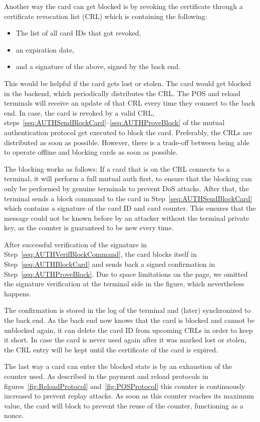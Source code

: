 \documentclass{article}
\begin{document}
Another way the card can get blocked is by revoking the certificate through a certificate revocation list (CRL) which is containing the following:
\begin{itemize}
    \item The list of all card IDs that got revoked,
    \item an expiration date,
    \item and a signature of the above, signed by the back end.
\end{itemize}
This would be helpful if the card gets lost or stolen.
The card would get blocked in the backend, which periodically distributes the CRL\@.
The POS and reload terminals will receive an update of that CRL every time they connect to the back end.
In case, the card is revoked by a valid CRL, steps~\ref{seq:AUTHSendBlockCard}--\ref{seq:AUTHProveBlock} of the mutual authentication protocol get executed to block the card.
Preferably, the CRLs are distributed as soon as possible. 
However, there is a trade-off between being able to operate offline and blocking cards as soon as possible.

The blocking works as follows:
If a card that is on the CRL connects to a terminal, it will perform a full mutual auth first, to ensure that the blocking can only be performed by genuine terminals to prevent DoS attacks.
After that, the terminal sends a block command to the card in Step~\ref{seq:AUTHSendBlockCard} which contains a signature of the card ID and card counter.
This ensures that the message could not be known before by an attacker without the terminal private key, as the counter is guaranteed to be new every time.

After successful verification of the signature in Step~\ref{seq:AUTHVerifBlockCommand}, the card blocks itself in Step~\ref{seq:AUTHBlockCard} and sends back a signed confirmation in Step~\ref{seq:AUTHProveBlock}.
Due to space limitations on the page, we omitted the signature verification at the terminal side in the figure, which nevertheless happens.

The confirmation is stored in the log of the terminal and (later) synchronized to the back end.
As the back end now knows that the card is blocked and cannot be unblocked again, it can delete the card ID from upcoming CRLs in order to keep it short.
In case the card is never used again after it was marked lost or stolen, the CRL entry will be kept until the certificate of the card is expired.

The last way a card can enter the blocked state is by an exhaustion of the counter used.
As described in the payment and reload protocols in figures~\ref{fig:ReloadProtocol} and~\ref{fig:POSProtocol} this counter is continuously increased to prevent replay attacks.
As soon as this counter reaches its maximum value, the card will block to prevent the reuse of the counter, functioning as a nonce.
\end{document}
